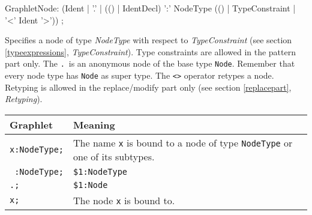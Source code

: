 \begin{rail}
GraphletNode: (Ident | 
    '.' |
    (() | IdentDecl) ':' NodeType (() | TypeConstraint | '<' Ident '>')) ;   
\end{rail}
Specifies a node of type \emph{NodeType} with respect to \emph{TypeConstraint} (see section \ref{typeexpressions}, \emph{TypeConstraint}). 
Type constraints are allowed in the pattern part only. 
The \texttt{.}\ is an anonymous node of the base type \texttt{Node}. 
Remember that every node type has \texttt{Node} as super type. The \texttt{<>} operator retypes a node. Retyping is allowed in the replace/modify part only (see section \ref{replacepart}, \emph{Retyping}).
\begin{center}
  \begin{tabular}[c]{ll}
    \textbf{Graphlet} & \textbf{Meaning}\\ \hline
    \texttt{x:NodeType;} & The name \texttt{x} is bound to a node of type \texttt{NodeType} or one of its subtypes. \\
    \texttt{ :NodeType;} & \texttt{\$1:NodeType} \\
    \texttt{.;} & \texttt{\$1:Node} \\
    \texttt{x;} & The node \texttt{x} is bound to.
  \end{tabular}
\end{center} 

